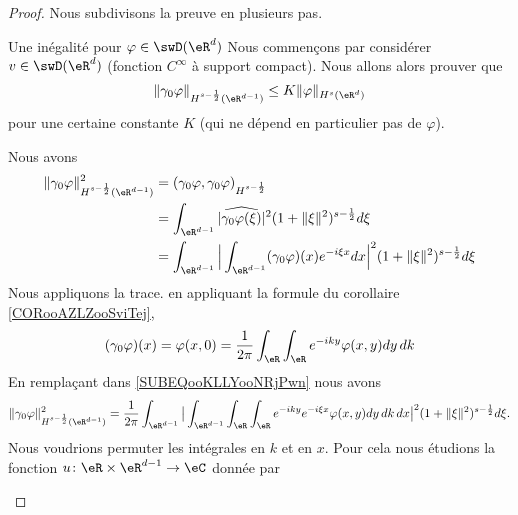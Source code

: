 \begin{proof}
    Nous subdivisons la preuve en plusieurs pas.
    \begin{subproof}
        \item[Une inégalité pour \( \varphi\in\swD(\eR^d)\)]
            Nous commençons par considérer \( v\in \swD(\eR^d)\) (fonction \(  C^{\infty}\) à support compact). Nous allons alors prouver que
            \begin{equation}
                \| \gamma_0\varphi \|_{H^{s-\frac{ 1 }{2}}(\eR^{d-1})}\leq K\| \varphi \|_{H^s(\eR^d)}
            \end{equation}
            pour une certaine constante \( K\) (qui ne dépend en particulier pas de \( \varphi\)).

            Nous avons
            \begin{subequations}
                \begin{align}
                    \| \gamma_0\varphi \|^2_{H^{s-\frac{ 1 }{2}}(\eR^{d-1})}&=(  \gamma_0\varphi,\gamma_0\varphi  )_{H^{s-\frac{ 1 }{2}}}\\
                    &=\int_{\eR^{d-1}}| \widehat{\gamma_0\varphi(\xi)} |^2(1+\| \xi \|^2)^{s-\frac{ 1 }{2}}d\xi\\
                    &=\int_{\eR^{d-1}}\Big| \int_{\eR^{d-1}}(\gamma_0\varphi)(x) e^{-i\xi x}dx \Big|^2(1+\| \xi \|^2)^{s-\frac{ 1 }{2}}d\xi \label{SUBEQooKLLYooNRjPwn} \\
                \end{align}
            \end{subequations}
            Nous appliquons la trace. en appliquant la formule du corollaire \ref{CORooAZLZooSviTej},
            \begin{equation}
                (\gamma_0\varphi)(x)= \varphi(x,0) =\frac{1}{ 2\pi }\int_{\eR}\int_{\eR} e^{-iky}\varphi(x,y)dy\,dk
            \end{equation}
            En remplaçant dans \eqref{SUBEQooKLLYooNRjPwn} nous avons
            \begin{equation}
                \| \gamma_0\varphi \|^2_{H^{s-\frac{ 1 }{2}}(\eR^{d-1})}=\frac{1}{ 2\pi }\int_{\eR^{d-1}}\big| \int_{\eR^{d-1}}\int_{\eR}\int_{\eR} e^{-iky} e^{-i\xi x}\varphi(x,y)dy\,dk\,dx \big|^2(1+\| \xi \|^2)^{s-\frac{ 1 }{2}}d\xi.
            \end{equation}
            Nous voudrions permuter les intégrales en \( k\) et en \( x\). Pour cela nous étudions la fonction \( u\colon \eR\times \eR^{d-1}\to \eC\) donnée par
            \begin{equation}

\end{equation}
\end{subproof}
\end{proof}
